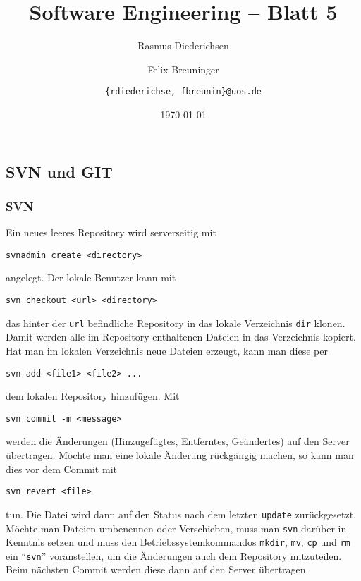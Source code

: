 \documentclass{scrartcl}
\title{\rmfamily Software Engineering -- Blatt 5}
\author{Rasmus Diederichsen \and Felix Breuninger\and 
   \texttt{\{rdiederichse, fbreunin\}@uos.de}
}
\date{\today}
\begin{document}
\selectfont
\maketitle

\setcounter{section}{5}
\setcounter{subsection}{0}

\subsection{SVN und GIT}

\subsubsection{SVN}

Ein neues leeres Repository wird serverseitig mit 
\begin{lstlisting}
svnadmin create <directory>
\end{lstlisting} angelegt. Der lokale Benutzer kann mit 
\begin{lstlisting}
svn checkout <url> <directory>
\end{lstlisting} das hinter der \texttt{url}
 befindliche Repository in das lokale Verzeichnis 
\texttt{dir} klonen. Damit werden alle im Repository enthaltenen Dateien in das
Verzeichnis kopiert. Hat man im lokalen Verzeichnis neue Dateien erzeugt, kann
man diese per 
\begin{lstlisting}
svn add <file1> <file2> ...
\end{lstlisting} dem lokalen Repository hinzufügen. Mit 
\begin{lstlisting}
svn commit -m <message>
\end{lstlisting} werden die Änderungen
(Hinzugefügtes, Entferntes, Geändertes) auf den Server übertragen. Möchte man
eine lokale Änderung rückgängig machen, so kann man dies vor dem Commit mit

\begin{lstlisting}
svn revert <file>
\end{lstlisting}
 tun. Die Datei wird dann auf den Status nach dem
letzten \texttt{update} zurückgesetzt. Möchte man Dateien umbenennen oder
Verschieben, muss man 
\texttt{svn} darüber in Kenntnis setzen und muss den
Betriebssystemkommandos 
\texttt{mkdir}, \texttt{mv}, \texttt{cp} und 
\texttt{rm} ein ``\texttt{svn}''
voranstellen, um die Änderungen auch dem Repository mitzuteilen. Beim nächsten
Commit werden diese dann auf den Server übertragen.
\end{document}
